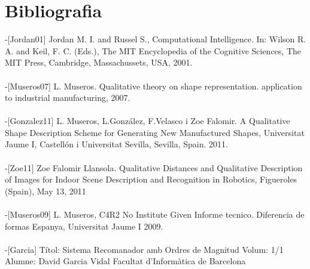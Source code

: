 \documentclass{article}
\begin{document}
\section{Bibliografia}
-[Jordan01] Jordan M. I. and Russel S., Computational Intelligence. In: Wilson R. A. and Keil, F. C. (Eds.), The MIT Encyclopedia of the Cognitive Sciences, The MIT Press, Cambridge, Massachussets, USA, 2001.
\\
\\
-[Museros07] L. Museros. Qualitative theory on shape representation. application to industrial manufacturing, 2007.
\\
\\
-[Gonzalez11]  L. Museros, L.González, F.Velasco i Zoe Falomir. A Qualitative Shape Description Scheme for Generating New Manufactured Shapes, Universitat Jaume I, Castellón i Universitat  Sevilla, Sevilla, Spain. 2011.
\\
\\
-[Zoe11] Zoe Falomir Llansola. Qualitative Distances and Qualitative Description of Images for Indoor Scene Description and Recognition in Robotics, Figueroles (Spain), May 13, 2011
\\
\\
-[Museros09] L. Museros, C4R2 No Institute Given Informe tecnico. Diferencia de formas Espanya, Universitat Jaume I 2009.
\\
\\
-[Garcia] Títol: Sistema Recomanador amb Ordres de Magnitud Volum: 1/1 Alumne: David Garcia Vidal Facultat d’Informàtica de Barcelona
\end{document}
